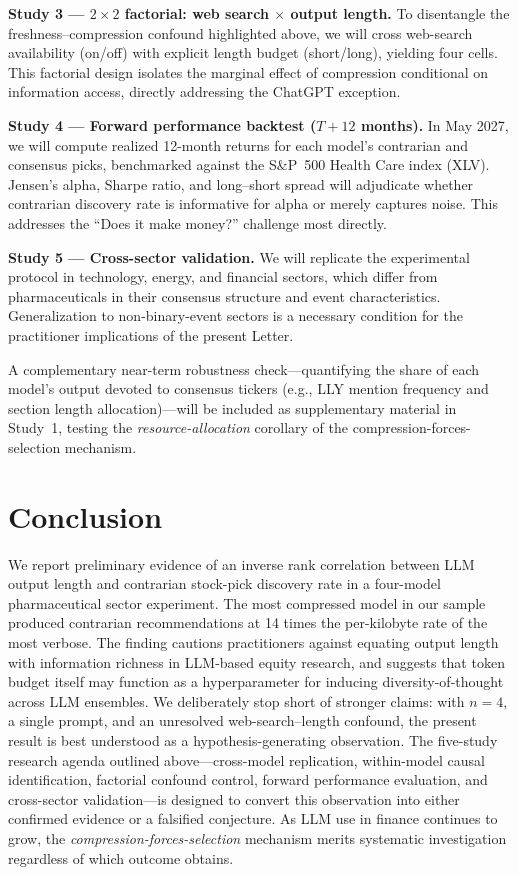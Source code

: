 \documentclass[11pt,letterpaper]{article}
\begin{document}
\textbf{Study 3 --- $2\times 2$ factorial: web search $\times$ output length.} To disentangle the freshness--compression confound highlighted above, we will cross web-search availability (on/off) with explicit length budget (short/long), yielding four cells. This factorial design isolates the marginal effect of compression conditional on information access, directly addressing the ChatGPT exception.

\textbf{Study 4 --- Forward performance backtest ($T+12$ months).} In May 2027, we will compute realized 12-month returns for each model's contrarian and consensus picks, benchmarked against the S\&P~500 Health Care index (XLV). Jensen's alpha, Sharpe ratio, and long--short spread will adjudicate whether contrarian discovery rate is informative for alpha or merely captures noise. This addresses the ``Does it make money?'' challenge most directly.

\textbf{Study 5 --- Cross-sector validation.} We will replicate the experimental protocol in technology, energy, and financial sectors, which differ from pharmaceuticals in their consensus structure and event characteristics. Generalization to non-binary-event sectors is a necessary condition for the practitioner implications of the present Letter.

A complementary near-term robustness check---quantifying the share of each model's output devoted to consensus tickers (e.g., LLY mention frequency and section length allocation)---will be included as supplementary material in Study~1, testing the \textit{resource-allocation} corollary of the compression-forces-selection mechanism.

\section{Conclusion}\label{sec:conclusion}

We report preliminary evidence of an inverse rank correlation between LLM output length and contrarian stock-pick discovery rate in a four-model pharmaceutical sector experiment. The most compressed model in our sample produced contrarian recommendations at 14 times the per-kilobyte rate of the most verbose. The finding cautions practitioners against equating output length with information richness in LLM-based equity research, and suggests that token budget itself may function as a hyperparameter for inducing diversity-of-thought across LLM ensembles. We deliberately stop short of stronger claims: with $n=4$, a single prompt, and an unresolved web-search--length confound, the present result is best understood as a hypothesis-generating observation. The five-study research agenda outlined above---cross-model replication, within-model causal identification, factorial confound control, forward performance evaluation, and cross-sector validation---is designed to convert this observation into either confirmed evidence or a falsified conjecture. As LLM use in finance continues to grow, the \textit{compression-forces-selection} mechanism merits systematic investigation regardless of which outcome obtains.
\end{document}
